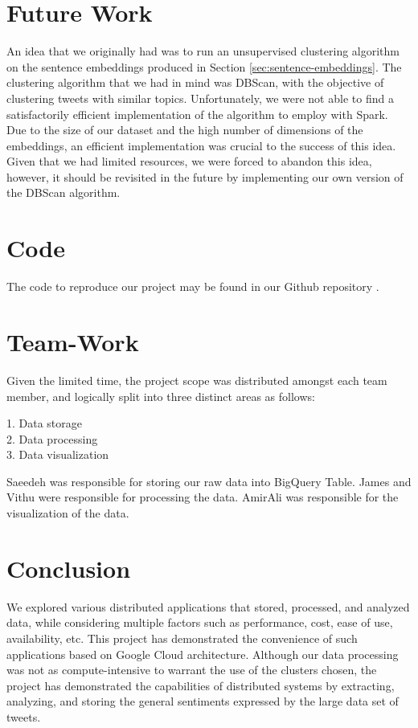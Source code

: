 \documentclass[a4paper,12pt]{article}
\begin{document}
\section{Future Work}
An idea that we originally had was to run an unsupervised clustering algorithm on the sentence embeddings produced in Section \ref{sec:sentence-embeddings}. The clustering algorithm that we had in mind was DBScan\cite{Ester96adensity-based}, with the objective of clustering tweets with similar topics. Unfortunately, we were not able to find a satisfactorily efficient implementation of the algorithm to employ with Spark. Due to the size of our dataset and the high number of dimensions of the embeddings, an efficient implementation was crucial to the success of this idea. Given that we had limited resources, we were forced to abandon this idea, however, it should be revisited in the future by implementing our own version of the DBScan algorithm.

\section{Code}
The code to reproduce our project may be found in our Github repository \cite{Githubrepository}.

\section{Team-Work}
Given the limited time, the project scope was distributed amongst each team member, and logically split into three distinct
areas as follows:

1. Data storage\\
2. Data processing\\
3. Data visualization

Saeedeh was responsible for storing our raw data into BigQuery Table.
James and Vithu were responsible for processing the data.
AmirAli was responsible for the visualization of the data.

\section{Conclusion}
We explored various distributed applications that stored, processed, and analyzed data, while considering multiple
factors such as performance, cost, ease of use, availability, etc. This project has demonstrated the convenience
of such applications based on Google Cloud architecture. Although our data processing was not as compute-intensive
to warrant the use of the clusters chosen, the project has demonstrated the capabilities of distributed systems by
extracting, analyzing, and storing the general sentiments expressed by the large data set of tweets.

\nocite{*}



\end{document}
